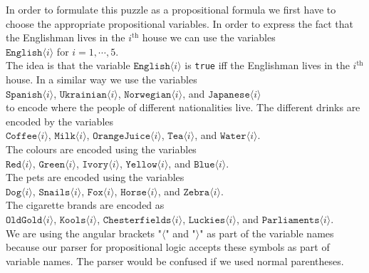 In order to formulate this puzzle as a propositional formula we first have to
choose the appropriate propositional variables.  In order to express the fact
that the Englishman lives in the $i^\textrm{th}$ house we can use the variables
\\[0.2cm]
\hspace*{1.3cm}
$\texttt{English}\langle i \rangle$ \quad for $i=1,\cdots,5$.
\\[0.2cm]
The idea is that the variable $\texttt{English}\langle i \rangle$ is \texttt{true} iff the
Englishman lives in the  $i^\textrm{th}$ house.  In a similar way we use the
variables
\\[0.2cm]
\hspace*{1.3cm}
$\texttt{Spanish}\langle i \rangle$,\;
$\texttt{Ukrainian}\langle i \rangle$,\;
$\texttt{Norwegian}\langle i \rangle$,\; and 
$\texttt{Japanese}\langle i \rangle$
\\[0.2cm]
to encode where the people of different nationalities live.
The different drinks are encoded by the variables
\\[0.2cm]
\hspace*{1.3cm}
$\texttt{Coffee}\langle i \rangle$,\; $\texttt{Milk}\langle i \rangle$,\; $\texttt{OrangeJuice}\langle i \rangle$,\; $\texttt{Tea}\langle i \rangle$,\; and $\texttt{Water}\langle i \rangle$.
\\[0.2cm] 
The colours are encoded using the variables 
\\[0.2cm]
\hspace*{1.3cm}
$\texttt{Red}\langle i \rangle$,\;
$\texttt{Green}\langle i \rangle$,\;
$\texttt{Ivory}\langle i \rangle$,\;
$\texttt{Yellow}\langle i \rangle$,\; and $\texttt{Blue}\langle i \rangle$.
\\[0.2cm]
The pets are encoded using the variables
\\[0.2cm]
\hspace*{1.3cm}
$\texttt{Dog}\langle i \rangle$,\;
$\texttt{Snails}\langle i \rangle$,\;
$\texttt{Fox}\langle i \rangle$,\;
$\texttt{Horse}\langle i \rangle$,\;
and $\texttt{Zebra}\langle i \rangle$.
\\[0.2cm]
The cigarette brands are encoded as
\\[0.2cm]
\hspace*{1.3cm}
$\texttt{OldGold}\langle i \rangle$,\; $\texttt{Kools}\langle i \rangle$,\;
$\texttt{Chesterfields}\langle i \rangle$,\; $\texttt{Luckies}\langle i \rangle$,\; and
$\texttt{Parliaments}\langle i \rangle$.
\\[0.2cm]
We are using the angular brackets "$\langle$" and "$\rangle$" as part of the
variable names because our parser for propositional logic accepts these symbols
as part of variable names.  The parser would be confused if we used
normal parentheses.  

